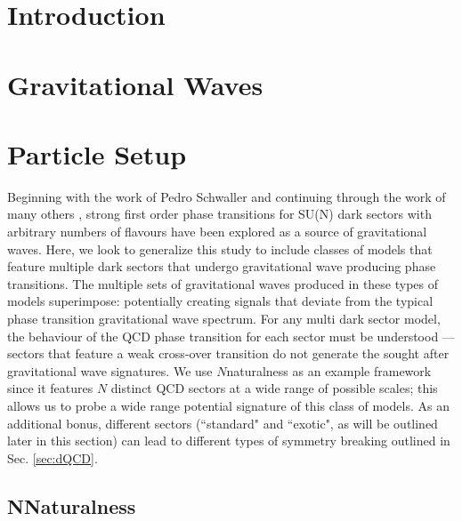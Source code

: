 \documentclass[nofootinbib,twocolumn,preprintnumbers]{revtex4-2}
\begin{document}
\maketitle

\section{Introduction} 
\label{sec:intro} 

\section{Gravitational Waves}
\label{sec:gw}

\section{Particle Setup}
\label{sec:nn}

Beginning with the work of Pedro Schwaller \cite{Schwaller:2015tja} and continuing through the work of many others \cite{everyoneelse}, strong first order phase transitions for SU(N) dark sectors with arbitrary numbers of flavours have been explored as a source of gravitational waves. Here, we look to generalize this study to include classes of models that feature multiple dark sectors that undergo gravitational wave producing phase transitions. The multiple sets of gravitational waves produced in these types of models superimpose: potentially creating signals that deviate from the typical phase transition gravitational wave spectrum. For any multi dark sector model, the behaviour of the QCD phase transition for each sector must be understood --- sectors that feature a weak cross-over transition do not generate the sought after gravitational wave signatures. We use $N$naturalness as an example framework since it features $N$ distinct QCD sectors at a wide range of possible scales; this allows us to probe a wide range potential signature of this class of models. As an additional bonus, different sectors (``standard" and ``exotic", as will be outlined later in this section) can lead to different types of symmetry breaking outlined in Sec. \ref{sec:dQCD}.

\subsection{NNaturalness}
\end{document}
